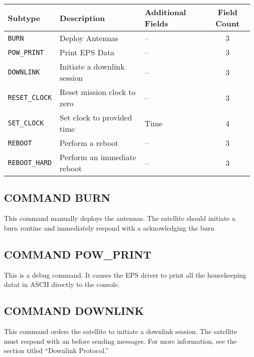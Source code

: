\documentclass{article}
\begin{document}
  \begin{center}
  \begin{tabular}{| l | l | l | c |}
    \hline
    Subtype & Description & Additional Fields & Field Count \\ \hline
    \texttt{BURN} & Deploy Antennas & -- & 3\\
    \texttt{POW\_PRINT} & Print EPS Data & -- & 3\\
    \texttt{DOWNLINK} & Initiate a downlink session & -- & 3\\
    \texttt{RESET\_CLOCK} & Reset mission clock to zero & -- & 3\\
    \texttt{SET\_CLOCK} & Set clock to provided time & Time & 4\\
    \texttt{REBOOT} & Perform a reboot & -- & 3\\
    \texttt{REBOOT\_HARD} & Perform an immediate reboot & -- & 3\\
    \hline
  \end{tabular}
  \end{center}
  
  \subsection{COMMAND BURN}
  This command manually deploys the antennas. The satellite should initiate a burn routine and immediately respond
  with a \macommand acknowledging the burn
  
  
  \subsection{COMMAND POW\_PRINT}
  This is a debug command. It causes the EPS driver to print all the housekeeping datat in ASCII directly 
  to the console.
  
  
  \subsection{COMMAND DOWNLINK}
  This command orders the satellite to initiate a downlink session. The satellite must
  respond with an \macommand before sending \mdownlink messages. For more information,
  see the section titled ``Downlink Protocol.'' 
  
  
\end{document}
